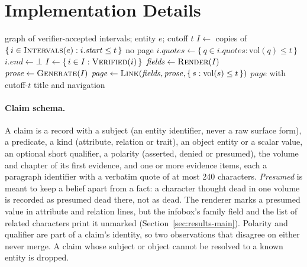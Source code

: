 \section{Implementation Details}
\label{app:implementation}

\begin{algorithm*}[t]
\caption{Assembling the page of entity $e$ at cutoff $t$.}
\label{alg:assemble}
\small
\begin{algorithmic}[1]
\Require graph of verifier-accepted intervals; entity $e$; cutoff $t$
\State $I \gets$ copies of $\{\, i \in \textsc{Intervals}(e) : i.\mathit{start} \le t \,\}$ 
 \Return no page 
\EndIf
{}
  \State $i.\mathit{quotes} \gets \{\, q \in i.\mathit{quotes} : \mathrm{vol}(q) \le t \,\}$ 
   \State $i.\mathit{end} \gets \bot$ 
  \EndIf
\EndFor
\State $I \gets \{\, i \in I : \textsc{Verified}(i) \,\}$ 
\State $\mathit{fields} \gets \textsc{Render}(I)$ 
\State $\mathit{prose} \gets \textsc{Generate}(I)$ 
\State $\mathit{page} \gets \textsc{Link}(\mathit{fields}, \mathit{prose}, \{\, s : \mathrm{vol}(s) \le t \,\})$ 
\State \Return $\mathit{page}$ with cutoff-$t$ title and navigation
\end{algorithmic}
\end{algorithm*}

\paragraph{Claim schema.} A claim is a record with a subject (an entity identifier, never a
raw surface form), a predicate, a kind (attribute, relation or trait), an object entity or a
scalar value, an optional short qualifier, a polarity (asserted, denied or presumed), the
volume and chapter of its first evidence, and one or more evidence items, each a paragraph
identifier with a verbatim quote of at most 240 characters. \emph{Presumed} is meant to keep a belief
apart from a fact: a character thought dead in one volume is recorded as presumed dead there,
not as dead. The renderer marks a presumed value in attribute and relation lines, but the
infobox's family field and the list of related characters print it unmarked
(Section~\ref{sec:results-main}). Polarity and qualifier are part of a claim's identity, so two observations that
disagree on either never merge. A claim whose subject or object cannot be resolved to a known
entity is dropped.

